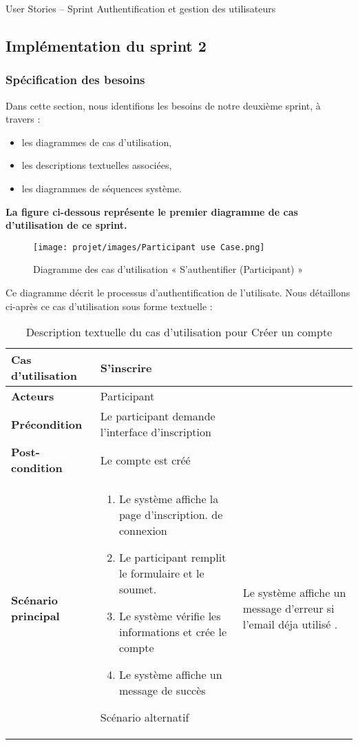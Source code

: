 \begin{table}[ht]
    \centering
    \caption{User Stories – Sprint Authentification et gestion des utilisateurs} 
\end{table}
\subsection{Implémentation du sprint 2}
\subsubsection{Spécification des besoins}
Dans cette section, nous identifions les besoins de notre deuxième sprint, à travers :
\begin{itemize}
    \item les diagrammes de cas d’utilisation,
    \item les descriptions textuelles associées,
    \item les diagrammes de séquences système.
\end{itemize}

\textbf {La figure ci-dessous représente le premier diagramme de cas d’utilisation de ce sprint.}

\begin{figure}[H]
    \centering
    \texttt{[image: projet/images/Participant use Case.png]}
    \caption{Diagramme des cas d’utilisation « S’authentifier (Participant) »}
    \label{fig:equipe_scrum}
\end{figure}

Ce diagramme décrit le processus d’authentification de l’utilisate. Nous détaillons ci-après ce cas d’utilisation sous forme textuelle :

\begin{longtable}{|>{\bfseries}p{4cm}|p{10cm}|}
\hline
Cas d’utilisation &  S'inscrire  \\
\hline
Acteurs & Participant \\
\hline
Précondition & Le participant demande l’interface d’inscription\\
\hline
Post-condition & Le compte est créé\\
\hline
Scénario principal & 
\begin{enumerate}
  \item  Le système affiche la page d’inscription.
de connexion

  \item Le participant remplit le formulaire et le soumet.

  \item Le système vérifie les informations et crée le compte
  \item Le système affiche un message de succès
\end{enumerate} 
\hline
Scénario alternatif & Le système affiche un message d’erreur si l'email déja utilisé .
 \hline
\caption{Description textuelle du cas d’utilisation pour Créer un compte}
\end{longtable}


